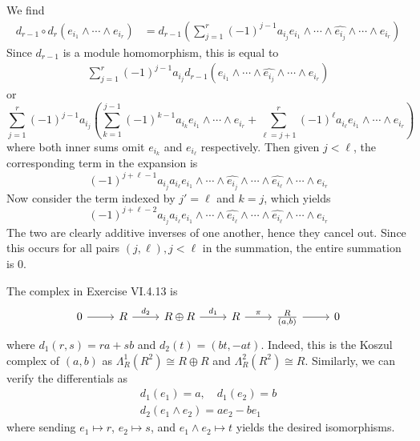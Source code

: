\documentclass[../../master.tex]{subfiles}
\begin{document}
\begin{solution}
    We find
    \begin{align*}
        d_{r-1} \circ d_r(e_{i_1} \wedge \cdots \wedge e_{i_r}) &= d_{r-1} \left( \sum_{j=1}^{r} (-1)^{j-1} a_{i_j} e_{i_1} \wedge \cdots \wedge \hat{e_{i_j}} \wedge \cdots \wedge e_{i_r}\right)
    \end{align*}
    Since $d_{r-1}$ is a module homomorphism, this is equal to
    \begin{gather*}
        \sum_{j=1}^{r} (-1)^{j-1} a_{i_j} d_{r-1} (e_{i_1} \wedge \cdots \wedge \hat{e_{i_j}} \wedge \cdots \wedge e_{i_r})
    \end{gather*}
    or
    \[
        \sum_{j=1}^{r} (-1)^{j-1} a_{i_j} \left(
        \sum_{k=1}^{j-1} (-1)^{k-1} a_{i_k} e_{i_1} \wedge \cdots \wedge e_{i_r}
        + \sum_{\ell = j+1}^{r} (-1)^{\ell} a_{i_\ell} e_{i_1} \wedge \cdots \wedge e_{i_r} \right)
    \]
    where both inner sums omit $e_{i_k}$ and $e_{i_\ell}$ respectively.
    Then given $j < \ell$, the corresponding term in the expansion is
    \[
        (-1)^{j+\ell-1} a_{i_j} a_{i_\ell} e_{i_1} \wedge \cdots \wedge \hat{e_{i_j}} \wedge \cdots \wedge \hat{e_{i_\ell}} \wedge \cdots \wedge e_{i_r}
    \]
    Now consider the term indexed by  $j' = \ell$ and $k = j$, which yields
    \[
        (-1)^{j+\ell-2} a_{i_j} a_{i_\ell} e_{i_1} \wedge \cdots \wedge \hat{e_{i_\ell}} \wedge \cdots \wedge \hat{e_{i_\ell}} \wedge \cdots \wedge e_{i_r}
    \]
    The two are clearly additive inverses of one another, hence they cancel out.
    Since this occurs for all pairs $(j, \ell), j < \ell$ in the summation, the entire summation is 0.

    The complex in Exercise VI.4.13 is
    \[
        \begin{tikzcd}
            0 & R & R \oplus R & R & \frac{R}{(a, b)} & 0
            \arrow[from=1-1, to=1-2]
            \arrow[from=1-2, to=1-3, "d_2"]
            \arrow[from=1-3, to=1-4, "d_1"]
            \arrow[from=1-4, to=1-5, "\pi"]
            \arrow[from=1-5, to=1-6] 
        \end{tikzcd}
    \]
    where $d_1(r, s) = ra + sb$ and $d_2(t) = (bt, -at)$.
    Indeed, this is the Koszul complex of $(a, b)$ as $\Lambda_R^{1}(R^{2}) \cong R \oplus R$ and $\Lambda_R^{2}(R^2) \cong R$.
    Similarly, we can verify the differentials as
    \begin{gather*}
        d_1(e_1) = a, \quad d_1(e_2) = b \\
        d_2(e_1 \wedge e_2) = a e_2 - b e_1
    \end{gather*}
    where sending $e_1 \mapsto r$, $e_2 \mapsto s$, and $e_1 \wedge e_2 \mapsto t$ yields the desired isomorphisms.


\end{solution}
\end{document}
